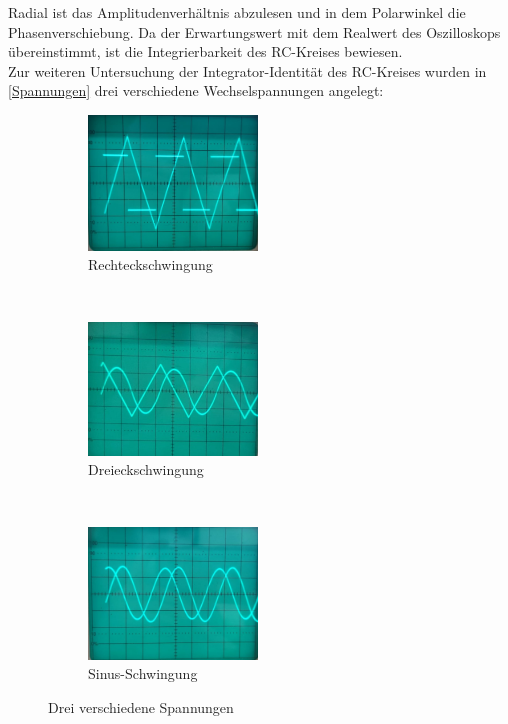 Radial ist das Amplitudenverhältnis abzulesen und in dem Polarwinkel die Phasenverschiebung. Da der Erwartungswert mit dem Realwert
des Oszilloskops übereinstimmt, ist die Integrierbarkeit des RC-Kreises bewiesen. \\
Zur weiteren Untersuchung der Integrator-Identität des RC-Kreises wurden in \autoref{Spannungen} drei verschiedene Wechselspannungen angelegt:
\begin{figure}
	\centering
	\begin{subfigure}[b]{0.3\textwidth}
		\centering
		\includegraphics[width=4.5cm]{build/integrator-rechteck.jpeg}
		\caption{Rechteckschwingung}
	\end{subfigure}
	~
	\begin{subfigure}[b]{0.3\textwidth}
		\centering
		\includegraphics[width=4.5cm]{build/integrator-saegezahn.jpeg}
		\caption{Dreieckschwingung}
	\end{subfigure}
	~
	\begin{subfigure}[b]{0.3\textwidth}
		\centering
		\includegraphics[width=4.5cm]{build/integrator-sinus.jpeg}
		\caption{Sinus-Schwingung}
	\end{subfigure}
  \caption{Drei verschiedene Spannungen}
  \label{Spannungen}
\end{figure}

\newpage